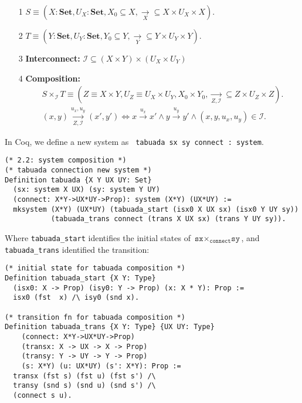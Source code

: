 \documentclass{article}
\begin{document}
\begin{itemize}
    \item[1]
        $S \equiv (X: \textbf{Set}, U_X: \textbf{Set}, X_0 \subseteq X, \underset{X}{\rightarrow} \subseteq X \times U_X \times X)$.
    \item[2] 
        $T \equiv (Y: \textbf{Set}, U_Y: \textbf{Set}, Y_0 \subseteq Y, \underset{Y}{\rightarrow} \subseteq Y \times U_Y \times Y)$.

    \item[3] \textbf{Interconnect:}
        $\mathcal I \subseteq (X \times Y) \times (U_X \times U_Y)$
    \item[4] \textbf{Composition:}
\begin{align*}
    &S \times_{\mathcal I} T \equiv 
     (Z \equiv X \times Y, U_Z \equiv U_X \times U_Y,  X_0 \times Y_0, \underset{Z, \mathcal{I}}{\rightarrow} \subseteq Z \times U_Z \times Z). \\
    &(x, y) \underset{Z, \mathcal I}{\xrightarrow{u_x,u_y}} (x', y') \iff 
      x \xrightarrow{u_x} x' \land 
      y \xrightarrow{u_y} y' \land (x, y, u_x, u_y) \in \mathcal I.
\end{align*}
\end{itemize}

In Coq, we define a new system as \texttt{ tabuada sx sy connect : system}.

\begin{verbatim}
(* 2.2: system composition *)
(* tabuada connection new system *)
Definition tabuada {X Y UX UY: Set} 
  (sx: system X UX) (sy: system Y UY)
  (connect: X*Y->UX*UY->Prop): system (X*Y) (UX*UY) :=
  mksystem (X*Y) (UX*UY) (tabuada_start (isx0 X UX sx) (isx0 Y UY sy))
           (tabuada_trans connect (trans X UX sx) (trans Y UY sy)).
\end{verbatim}

Where \texttt{tabuada\_start} identifies the initial states of $\texttt{sx} \times_{\texttt{connect}} \texttt{sy}$,
and \texttt{tabuada\_trans} identified the transition:
\begin{verbatim}
(* initial state for tabuada composition *)
Definition tabuada_start {X Y: Type}
  (isx0: X -> Prop) (isy0: Y -> Prop) (x: X * Y): Prop :=
  isx0 (fst  x) /\ isy0 (snd x).

(* transition fn for tabuada composition *)                                                            
Definition tabuada_trans {X Y: Type} {UX UY: Type}
    (connect: X*Y->UX*UY->Prop)
    (transx: X -> UX -> X -> Prop)
    (transy: Y -> UY -> Y -> Prop)
    (s: X*Y) (u: UX*UY) (s': X*Y): Prop :=
  transx (fst s) (fst u) (fst s') /\
  transy (snd s) (snd u) (snd s') /\
  (connect s u).
\end{verbatim}
\end{document}
